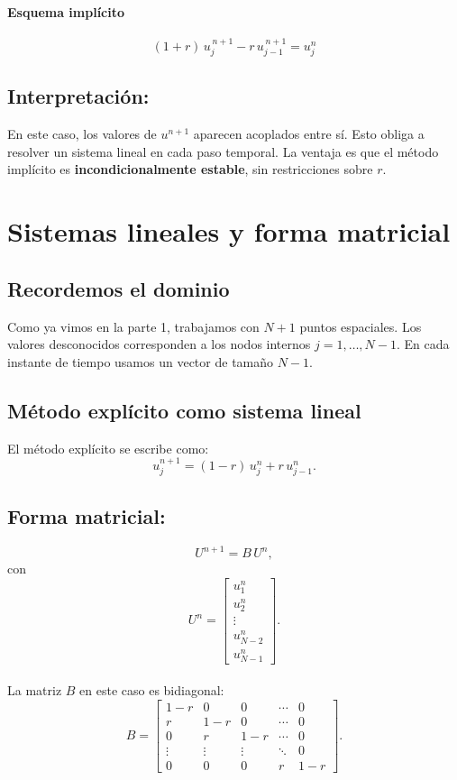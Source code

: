 \documentclass[12pt,a4paper]{article}
\begin{document}
\paragraph{Esquema implícito}  
\[
\boxed{(1+r)\,u_j^{\,n+1} - r\,u_{j-1}^{\,n+1} = u_j^n}
\]

\subsection*{Interpretación:}
En este caso, los valores de $u^{n+1}$ aparecen acoplados entre sí.  
Esto obliga a resolver un sistema lineal en cada paso temporal.  
La ventaja es que el método implícito es \textbf{incondicionalmente estable}, sin restricciones sobre $r$.

\section{Sistemas lineales y forma matricial}

\subsection{Recordemos el dominio}
Como ya vimos en la parte 1, trabajamos con $N+1$ puntos espaciales.  
Los valores desconocidos corresponden a los nodos internos $j=1,\dots,N-1$. En cada instante de tiempo usamos un vector de tamaño $N-1$.

\subsection{Método explícito como sistema lineal}

El método explícito se escribe como:
\[
u_j^{n+1} = (1-r)\,u_j^n + r\,u_{j-1}^n.
\]

\subsection*{Forma matricial:}
\[
U^{n+1} = B\,U^n,
\]
con
\[
U^n = 
\begin{bmatrix}
u_1^n \\[4pt] u_2^n \\[4pt] \vdots \\[4pt] u_{N-2}^n \\[4pt] u_{N-1}^n
\end{bmatrix}.
\] \\

La matriz $B$ en este caso es bidiagonal:
\[
B = 
\begin{bmatrix}
1-r & 0   & 0   & \cdots & 0 \\[4pt]
r   & 1-r & 0   & \cdots & 0 \\[4pt]
0   & r   & 1-r & \cdots & 0 \\[4pt]
\vdots & \vdots & \vdots & \ddots & 0 \\[4pt]
0   & 0   & 0   & r      & 1-r
\end{bmatrix}.
\]
\end{document}
